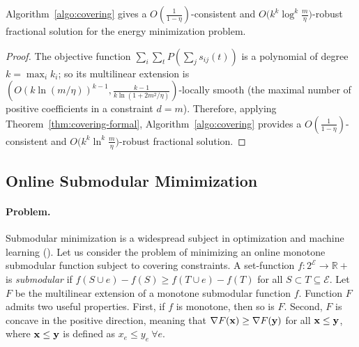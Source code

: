 \begin{proposition}
Algorithm~\ref{algo:covering} gives a
$O(\frac{1}{1 - \eta})$-consistent and $O\bigl(k^{k} \log^{k} \frac{m}{\eta}\bigr)$-robust fractional solution
for the energy minimization problem.
\end{proposition}
%
\begin{proof}
The objective function $\sum_{i} \sum_{t} P(\sum_{j} s_{ij}(t))$ is a polynomial of degree $k = \max_{i} k_{i}$;
so its multilinear extension is
$(O(k \ln(m/\eta))^{k-1}, \frac{k-1}{k \ln(1 + 2m^{2}/\eta)})$-locally smooth
(the maximal number of positive coefficients in a constraint $d = m$).
Therefore, applying Theorem~\ref{thm:covering-formal},
Algorithm~\ref{algo:covering} provides a $O(\frac{1}{1 - \eta})$-consistent and $O\bigl(k^{k} \ln^{k} \frac{m}{\eta}\bigr)$-robust
fractional solution.
\end{proof}




\subsection{Online Submodular Mimimization}	\label{apix:sub-min}

\paragraph{Problem.} Submodular minimization is a widespread subject in optimization and machine learning (\cite{IwataFleischer01:A-combinatorial-strongly,Bachothers13:Learning-with,Bach16:Submodular-functions:,BalkanskiSinger:2020}). Let us consider the problem of minimizing an online monotone submodular function subject to covering constraints.
A set-function $f: 2^{\mathcal{E}} \rightarrow \mathbb{R}+$ is \emph{submodular} if
$f(S \cup e) - f(S) \geq f(T \cup e) - f(T)$ for all $S \subset T \subseteq \mathcal{E}$.
Let $F$ be the multilinear extension of a monotone submodular function $f$. Function $F$
admits two useful properties. First, if $f$ is monotone, then so is $F$. Second, $F$ is concave in
the positive direction, meaning that $\nabla F(\mathbf{x}) \geq \nabla F(\mathbf{y})$ for all $\mathbf{x} \leq \mathbf{y}$, where $\mathbf{x} \leq \mathbf{y}$ is defined as $x_{e} \leq y_{e} ~\forall e$.

